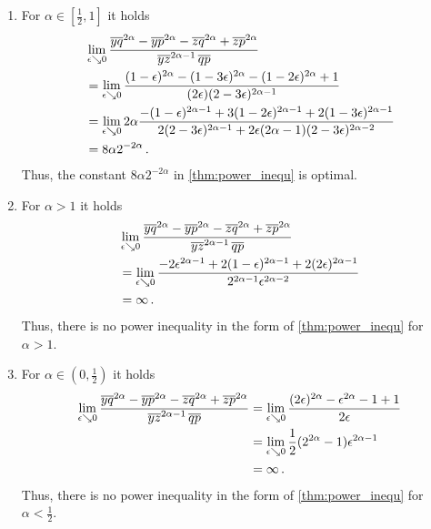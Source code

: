 \begin{enumerate}[label=(\alph*)]
\item 
	For $\alpha \in [\frac12,1]$ it holds
	\begin{align*}
	&\lim_{\epsilon\searrow0}\frac{\overline{yq}^{2\alpha} - \overline{yp}^{2\alpha} - \overline{zq}^{2\alpha} + \overline{zp}^{2\alpha}}{ \overline{yz}^{2\alpha-1}\, \overline{qp}} 
	\\&= 
	\lim_{\epsilon\searrow0}\frac{(1-\epsilon)^{2\alpha} - (1-3\epsilon)^{2\alpha} - (1-2\epsilon)^{2\alpha} + 1}{ (2\epsilon)(2-3\epsilon)^{2\alpha-1}}
	\\&=
	\lim_{\epsilon\searrow0} 2\alpha\frac{-(1-\epsilon)^{2\alpha-1} +3(1-2\epsilon)^{2\alpha-1} +2(1-3\epsilon)^{2\alpha-1}}{ 2(2-3\epsilon)^{2\alpha-1}+2\epsilon(2\alpha-1)(2-3\epsilon)^{2\alpha-2}}
	\\&=8\alpha2^{-2\alpha}
	\, .
	\end{align*}
	Thus, the constant $8\alpha2^{-2\alpha}$ in \autoref{thm:power_inequ} is optimal.
\item	
	For $\alpha >1$ it holds
	\begin{align*}
	&\lim_{\epsilon\searrow0}\frac{\overline{yq}^{2\alpha} - \overline{yp}^{2\alpha} - \overline{zq}^{2\alpha} + \overline{zp}^{2\alpha}}{ \overline{yz}^{2\alpha-1}\, \overline{qp}} 
	\\&= 
	\lim_{\epsilon\searrow0}\frac{ - 2\epsilon^{2\alpha-1} + 2(1-\epsilon)^{2\alpha-1} + 2(2\epsilon)^{2\alpha-1}}{ 2^{2\alpha-1}\epsilon^{2\alpha-2}}
	\\&=
	\infty
	\, .
	\end{align*}
	Thus, there is no power inequality in the form of \autoref{thm:power_inequ} for $\alpha > 1$.
\item
	For $\alpha \in (0,\frac12)$ it holds
	\begin{align*}
	\lim_{\epsilon\searrow0}\frac{\overline{yq}^{2\alpha} - \overline{yp}^{2\alpha} - \overline{zq}^{2\alpha} + \overline{zp}^{2\alpha}}{ \overline{yz}^{2 \alpha-1}\, \overline{qp}} 
	&= 
	\lim_{\epsilon\searrow0}\frac{(2\epsilon)^{2\alpha} - \epsilon^{2\alpha} - 1 + 1}{2\epsilon} 
	\\&=
	\lim_{\epsilon\searrow0} \frac12(2^{2\alpha}-1)\epsilon^{2\alpha-1}
	\\&=\infty
	\, .
	\end{align*}
	Thus, there is no power inequality in the form of \autoref{thm:power_inequ} for $\alpha < \frac12$.
\end{enumerate}
%
%
%
